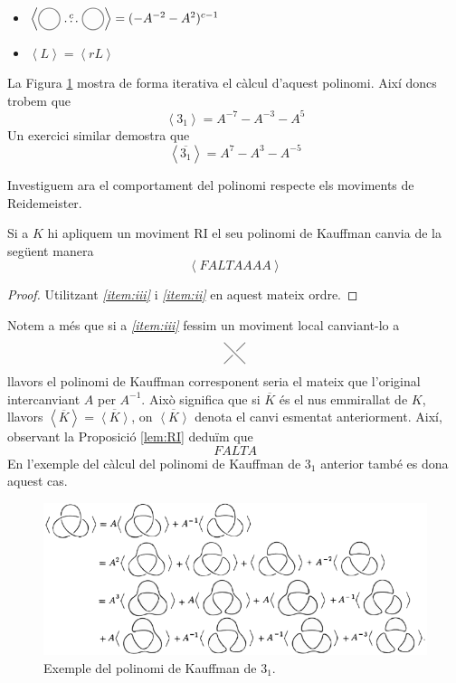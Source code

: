 \begin{itemize}
	\item $\left\langle\KPA\stackrel{c}{\dots}\KPA\right\rangle=(-A^{-2}-A^{2})^{c-1}$
	\item $\left\langle L\right\rangle=\left\langle rL\right\rangle$
\end{itemize}

La Figura \ref{fig:calculpolinomidekauffman} mostra de forma iterativa el càlcul d'aquest polinomi. Així doncs trobem que $$\left\langle 3_1\right\rangle=A^{-7}-A^{-3}-A^{5}$$ Un exercici similar demostra que $$\left\langle \overline{3_1}\right\rangle=A^{7}-A^{3}-A^{-5}$$

Investiguem ara el comportament del polinomi respecte els moviments de Reidemeister.

\begin{lemma}\label{lem:RI}
	Si a $K$ hi apliquem un moviment RI el seu polinomi de Kauffman canvia de la següent manera $$\left\langle FALTAAAA\right\rangle$$
\end{lemma}

\begin{proof}
	Utilitzant \textit{\ref{item:iii}} i \textit{\ref{item:ii}} en aquest mateix ordre.
\end{proof}

Notem a més que si a \textit{\ref{item:iii}} fessim un moviment local canviant-lo a $$\KPI$$ llavors el polinomi de Kauffman corresponent seria el mateix que l'original intercanviant $A$ per $A^{-1}$. Això significa que si $\overline{K}$ és el nus emmirallat de $K$, llavors $\left\langle\overline{K}\right\rangle=\overline{\left\langle K\right\rangle}$, on $\overline{\left\langle K\right\rangle}$ denota el canvi esmentat anteriorment. Així, observant la Proposició \ref{lem:RI} deduïm que $$FALTA$$ En l'exemple del càlcul del polinomi de Kauffman de $3_1$ anterior també es dona aquest cas.

\begin{figure}
	\centering
	\includegraphics[width=0.9\linewidth]{img/polinomidekauffman.png}
	\caption{Exemple del polinomi de Kauffman de $3_1$.}\label{fig:calculpolinomidekauffman}
\end{figure}

